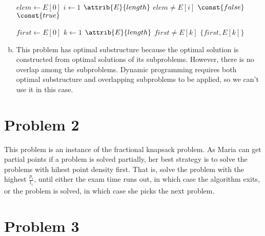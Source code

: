 \documentclass[a4paper, 10pt, twoside]{article}
\begin{document}
\begin{enumerate}[a)]
	      \begin{codebox}
		      \zi $elem \gets E[0]$
		      \zi \For $i \gets 1$ \To $\attrib{E}{length}$ \Do
		      \zi \If $elem \neq E[i]$
		      \zi \Then \Return $\const{false}$ \End \End
		      \zi \Return $\const{true}$ \End
	      \end{codebox}

	      \begin{codebox}
		      \Procname{$\proc{find-pair}(E)$}
		      \zi $first \gets E[0]$
		      \zi \For $k \gets 1$ \To $\attrib{E}{length}$ \Do
		      \zi \If $first \neq E[k]$
		      \zi \Then \Return $ \{ first, E[k] \} $ \End \End
	      \end{codebox}

	\item This problem has optimal substructure because the optimal solution is constructed from optimal solutions of its subproblems. However, there is no overlap among the subproblems. Dynamic programming requires both optimal substructure and overlapping subproblems to be applied, so we can't use it in this case. 
\end{enumerate}

\section*{Problem 2}

This problem is an instance of the fractional knapsack problem. As Maria can get partial points if a problem is solved partially, her best strategy is to solve the problems with hihest point density first. That is, solve the problem with the highest $\frac{p_i}{t_i}$, until either the exam time runs out, in which case the algorithm exits, or the problem is solved, in which case she picks the next problem.

\section*{Problem 3}
\end{document}
